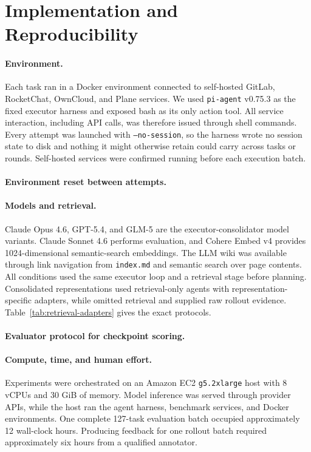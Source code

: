 \section{Implementation and Reproducibility}
\label{app:reproducibility}

\paragraph{Environment.}
Each task ran in a Docker environment connected to self-hosted GitLab,
RocketChat, OwnCloud, and Plane services. We used \texttt{pi-agent} v0.75.3 as
the fixed executor harness and exposed bash as its only action
tool. All service interaction, including API calls, was therefore
issued through shell commands. Every attempt was launched with
\texttt{--no-session}, so the harness wrote no session state to disk and
nothing it might otherwise retain could carry across tasks or rounds.
Self-hosted services were confirmed running before each execution batch.

\paragraph{Environment reset between attempts.}

\paragraph{Models and retrieval.}
Claude Opus 4.6, GPT-5.4, and GLM-5 are the executor-consolidator model
variants. Claude Sonnet 4.6 performs evaluation, and Cohere Embed v4
provides 1024-dimensional semantic-search embeddings. The LLM wiki was available through link navigation from
\texttt{index.md} and semantic search over page contents. All conditions used
the same executor loop and a retrieval stage before planning. Consolidated
representations used retrieval-only agents with representation-specific
adapters, while  omitted retrieval and  supplied raw
rollout evidence. Table~\ref{tab:retrieval-adapters} gives the exact
protocols.

\paragraph{Evaluator protocol for checkpoint scoring.}

\paragraph{Compute, time, and human effort.}
Experiments were orchestrated on an Amazon EC2 \texttt{g5.2xlarge} host with
8 vCPUs and 30 GiB of memory. Model inference was served through
provider APIs,
while the host ran the agent harness, benchmark services, and Docker
environments. One complete 127-task evaluation batch occupied approximately 12
wall-clock hours. Producing  feedback for one rollout
batch required approximately six hours from a qualified annotator.

